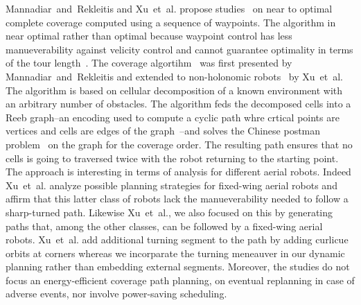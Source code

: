 Mannadiar~and~Rekleitis and Xu~et~al. propose studies~\citep{mannadiar2010optimal,xu2011optimal,xu2014efficient} on near to optimal complete coverage computed using a sequence of waypoints. The algorithm in near optimal rather than optimal because waypoint control has less manueverability against velicity control and cannot guarantee optimality in terms of the tour length~\citep{xu2014efficient}. The coverage algortihm~\citep{mannadiar2010optimal} was first presented by Mannadiar~and~Rekleitis and extended to non-holonomic robots~\citep{xu2011optimal,xu2014efficient} by Xu~et~al. The algorithm is based on cellular decomposition of a known environment with an arbitrary number of obstacles. The algorithm feds the decomposed cells into a Reeb graph--an encoding used to compute a cyclic path whre crtical points are vertices and cells are edges of the graph~\citep{fomenko1997topological}--and solves the Chinese postman problem~\citep{eiselt2000historical} on the graph for the coverage order. The resulting path ensures that no cells is going to traversed twice with the robot returning to the starting point. The approach is interesting in terms of analysis for different aerial robots. Indeed Xu~et~al. analyze possible planning strategies for fixed-wing aerial robots and affirm that this latter class of robots lack the manueverability needed to follow a sharp-turned path. Likewise Xu~et~al., we also focused on this by generating paths that, among the other classes, can be followed by a fixed-wing aerial robots. Xu~et~al. add additional turning segment to the path by adding curlicue orbits at corners whereas we incorparate the turning meneauver in our dynamic planning rather than embedding external segments. Moreover, the studies do not focus an energy-efficient coverage path planning, on eventual replanning in case of adverse events, nor involve power-saving scheduling.

